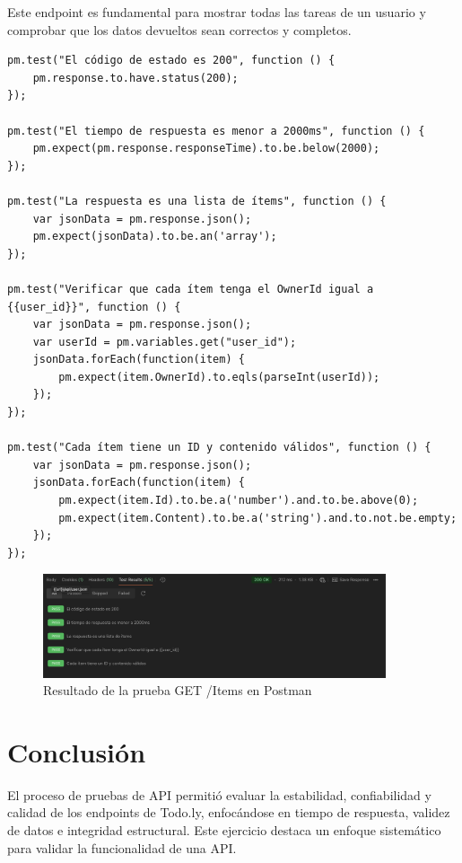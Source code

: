 \documentclass{report}
\begin{document}
Este endpoint es fundamental para mostrar todas las tareas de un usuario y comprobar que los datos devueltos sean correctos y completos.

\begin{lstlisting}
pm.test("El código de estado es 200", function () {
    pm.response.to.have.status(200);
});

pm.test("El tiempo de respuesta es menor a 2000ms", function () {
    pm.expect(pm.response.responseTime).to.be.below(2000);
});

pm.test("La respuesta es una lista de ítems", function () {
    var jsonData = pm.response.json();
    pm.expect(jsonData).to.be.an('array');
});

pm.test("Verificar que cada ítem tenga el OwnerId igual a {{user_id}}", function () {
    var jsonData = pm.response.json();
    var userId = pm.variables.get("user_id");
    jsonData.forEach(function(item) {
        pm.expect(item.OwnerId).to.eqls(parseInt(userId));
    });
});

pm.test("Cada ítem tiene un ID y contenido válidos", function () {
    var jsonData = pm.response.json();
    jsonData.forEach(function(item) {
        pm.expect(item.Id).to.be.a('number').and.to.be.above(0);
        pm.expect(item.Content).to.be.a('string').and.to.not.be.empty;
    });
});
\end{lstlisting}

\begin{figure}[h!]
    \centering
    \includegraphics[width=0.9\textwidth]{./imgs/tc4postman.png}
    \caption{Resultado de la prueba GET /Items en Postman}
    \label{fig:tc4postman}
\end{figure}

\section{Conclusión}
El proceso de pruebas de API permitió evaluar la estabilidad, confiabilidad y calidad de los endpoints de Todo.ly, enfocándose en tiempo de respuesta, validez de datos e integridad estructural. Este ejercicio destaca un enfoque sistemático para validar la funcionalidad de una API.
\end{document}
